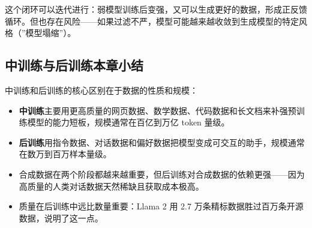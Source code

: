 这个闭环可以迭代进行：弱模型训练后变强，又可以生成更好的数据，形成正反馈循环。但也存在风险——如果过滤不严，模型可能越来越收敛到生成模型的特定风格（”模型塌缩”）。

\subsection{中训练与后训练本章小结}

中训练和后训练的核心区别在于数据的性质和规模：
\begin{itemize}
    \item \textbf{中训练}主要用更高质量的网页数据、数学数据、代码数据和长文档来补强预训练模型的能力短板，规模通常在百亿到万亿 token 量级。
    \item \textbf{后训练}用指令数据、对话数据和偏好数据把模型变成可交互的助手，规模通常在数万到百万样本量级。
    \item 合成数据在两个阶段都越来越重要，但后训练对合成数据的依赖更强——因为高质量的人类对话数据天然稀缺且获取成本极高。
    \item 质量在后训练中远比数量重要：Llama 2 用 2.7 万条精标数据胜过百万条开源数据，说明了这一点。
\end{itemize}

